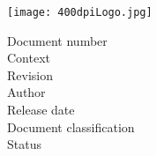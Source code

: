 \thispagestyle{empty}


\setlength{\unitlength}{1mm}


\phantom{test}
\begin{figure*}[h]
  \centering
  \texttt{[image: 400dpiLogo.jpg]}
\end{figure*}


\begin{center}
\fontsize{22}{24}\selectfont \sffamily\bigdoctitle
\end{center}

\vspace{1cm}

\noindent\normalsize{Document number \dotfill \docnr}\\
\normalsize{Context \dotfill \context}\\
\normalsize{Revision \dotfill \revision}\\
\normalsize{Author \dotfill \docauthor}\\
\normalsize{Release date \dotfill \docudate}\\
\normalsize{Document classification \dotfill \classification}\\
\normalsize{Status \dotfill \docstatus}





\newpage

\begin{center}
\signaturetable{\firstsigname}{\firstsigdesignation}{\firstsigaffiliation}
\end{center}


\vspace{0.5cm}

\begin{center}
\versiontable
\end{center}

\vspace{0.5cm}

\begin{center}
\organisationtable
\end{center}

